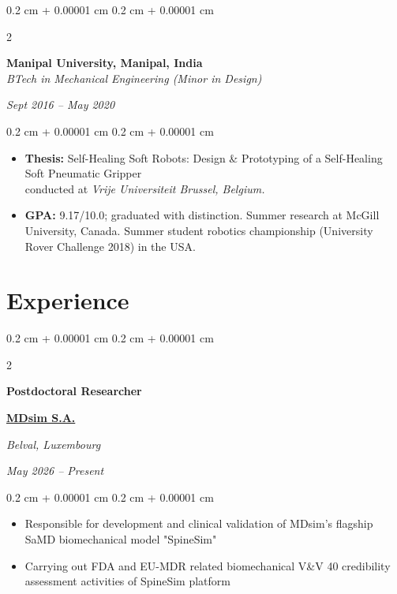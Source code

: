 \documentclass[10pt, letterpaper]{article}
\newenvironment{highlights}{
    \begin{itemize}[
        topsep=0.10 cm,
        parsep=0.10 cm,
        partopsep=0pt,
        itemsep=0pt,
        leftmargin=0.4 cm + 10pt
    ]
}{
    \end{itemize}
} %
\newenvironment{onecolentry}{
    \begin{adjustwidth}{
        0.2 cm + 0.00001 cm
    }{
        0.2 cm + 0.00001 cm
    }
}{
    \end{adjustwidth}
} %
\newenvironment{twocolentry}[2][]{
    \onecolentry
    \def\secondColumn{#2}
    \setcolumnwidth{\fill, 4.5 cm}
    \begin{paracol}{2}
}{
    \switchcolumn \raggedleft \secondColumn
    \end{paracol}
    \endonecolentry
} %
\let\hrefWithoutArrow\href
\renewcommand{\href}[2]{\hrefWithoutArrow{#1}{\ifthenelse{\equal{#2}{}}{ }{#2 }\raisebox{.15ex}{\footnotesize \faExternalLink*}}}
\begin{document}
\begin{twocolentry}{\textit{Sept 2016 – May 2020}}
    \textbf{Manipal University, Manipal, India} \\
    \textit{BTech in Mechanical Engineering (Minor in Design)}
\end{twocolentry}
\vspace{0.1cm}
\begin{onecolentry}
    \begin{highlights}
        \item \textbf{Thesis:} Self-Healing Soft Robots: Design \& Prototyping of a Self-Healing Soft Pneumatic Gripper \\ conducted at \textit{Vrije Universiteit Brussel, Belgium.}
        \item \textbf{GPA:} 9.17/10.0; graduated with distinction. Summer research at McGill University, Canada. Summer student robotics championship (University Rover Challenge 2018) in the USA.
    \end{highlights}
\end{onecolentry}





    
    \section{Experience}



        \begin{twocolentry}{
        \textit{Belval, Luxembourg}    
            
        \textit{May 2026 – Present}}
            \textbf{Postdoctoral Researcher}
            
            \textbf{\hrefWithoutArrow{https://mdsim.health/}{MDsim S.A.}}
        \end{twocolentry}

        \vspace{0.10 cm}
        \begin{onecolentry}
            \begin{highlights}
                \item Responsible for development and clinical validation of MDsim's flagship SaMD biomechanical model "SpineSim"
                \item Carrying out FDA and EU-MDR related biomechanical V\&V 40 credibility assessment activities of SpineSim platform
            \end{highlights}
        \end{onecolentry}
        \vspace{0.2 cm}
\end{document}
